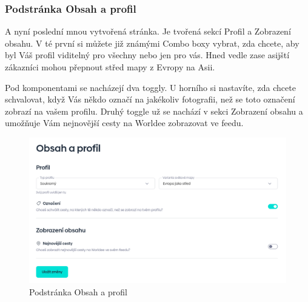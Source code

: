 \newpage
\subsubsection{Podstránka Obsah a profil}
A nyní poslední mnou vytvořená stránka. Je tvořená sekcí Profil a Zobrazení obsahu. V té první si můžete již známými Combo boxy vybrat, zda chcete, aby byl Váš profil viditelný pro všechny nebo jen pro vás. Hned vedle zase asijští zákazníci mohou přepnout střed mapy z Evropy na Asii.

Pod komponentami se nacházejí dva toggly. U horního si nastavíte, zda chcete schvalovat, když Vás někdo označí na jakékoliv fotografii, než se toto označení zobrazí na vašem profilu. Druhý toggle už se nachází v sekci Zobrazení obsahu a umožňuje Vám nejnovější cesty na Worldee zobrazovat ve feedu.

\begin{figure}[!h]
    \centering
    \includegraphics[width=1\linewidth]{obrazky/content_and_profile.png}
    \caption{Podstránka Obsah a profil}
\end{figure}


\newpage
